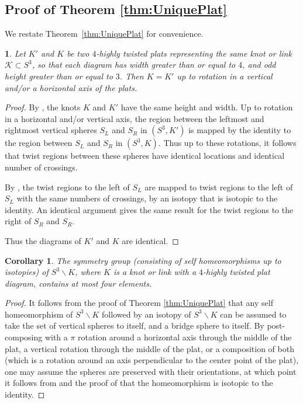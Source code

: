 \documentclass[12pt,reqno]{amsart}
\theoremstyle{plain}
\newtheorem{corollary}[theorem]{Corollary}
\newtheorem*{namedtheorem}{\theoremname}
\newcommand{\theoremname}{testing}
\newenvironment{named}[1]{\renewcommand{\theoremname}{#1}\begin{namedtheorem}}{\end{namedtheorem}}
\theoremstyle{definition}
\newcommand{\ssm}{\smallsetminus}
\begin{document}
\vskip10pt

\subsection{Proof of Theorem \ref{thm:UniquePlat}}
We restate Theorem~\ref{thm:UniquePlat} for convenience.

\begin{named}{\Cref{thm:UniquePlat}}
Let $K'$ and $K$ be two $4$-highly twisted plats 
representing the same knot or link $\mathcal{K} \subset S^3$, so that 
each diagram has width greater than or equal to $4$, and odd height greater 
than or  equal to $3$. Then $K=K'$ up to rotation in a 
vertical and/or a horizontal axis of the plats.
\end{named}

\begin{proof} 
By , the knots $K$ and $K'$ have the same height and width. 
Up to rotation in a horizontal and/or vertical axis, the region between the leftmost 
and rightmost vertical spheres $S_L$ and $S_R$ in $(S^3,K')$ is mapped by the identity
to the region between $S_L$ and $S_R$ in $(S^3,K)$. Thus up to these rotations, 
it follows that twist regions between these spheres have identical locations and 
identical number of crossings. 

By , the twist regions to the left of $S_L$ are mapped to 
twist regions to the left of $S_L$ with the same numbers of crossings, by an isotopy 
that is isotopic to the identity. An identical argument gives the same result for the 
twist regions to the right of $S_R$ and $S_R$. 

Thus the diagrams of $K'$ and $K$ are identical.
\end{proof}

\begin{corollary}\label{cor:Symmetries}
The symmetry group (consisting of self homeomorphisms up to isotopies) of  $S^3\ssm K$, 
where $K$ is a knot or link with a $4$-highly twisted plat diagram, contains at most four elements. 
\end{corollary}

\begin{proof}
    It follows from the proof of Theorem \ref{thm:UniquePlat} that any self homeomorphism of 
    $S^3\ssm K$ followed by an isotopy of $S^3\ssm K$ can be assumed to take the set of 
    vertical spheres to itself, and a bridge sphere to itself. By post-composing with a 
    $\pi$ rotation around a horizontal axis through the middle of the plat, a vertical 
    rotation through the middle of the plat, or a composition of both (which is a 
    rotation around an axis perpendicular to the center point of the plat), one may 
    assume the spheres are preserved with their orientations, at which point it 
    follows from  and the proof of 
     that the homeomorphism is isotopic to the identity.
\end{proof}
\end{document}
